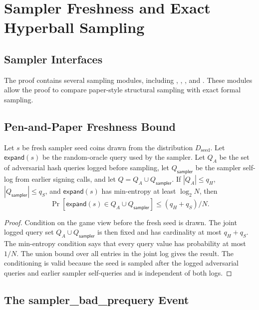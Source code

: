 \chapter{Sampler Freshness and Exact Hyperball Sampling}
\label{ch:sampler}

\section{Sampler Interfaces}

The proof contains several sampling modules, including
, ,
, and .
These modules allow the proof to compare paper-style structural sampling with
exact formal sampling.

\section{Pen-and-Paper Freshness Bound}

\begin{lemma}
Let \(s\) be fresh sampler seed coins drawn from the distribution
\(D_{\mathrm{seed}}\).  Let \(\mathsf{expand}(s)\) be the random-oracle query
used by the sampler.  Let \(Q_A\) be the set of adversarial hash queries logged
before sampling, let \(Q_{\mathsf{sampler}}\) be the sampler self-log from
earlier signing calls, and let
\(Q=Q_A\cup Q_{\mathsf{sampler}}\).  If \(|Q_A|\le q_H\),
\(|Q_{\mathsf{sampler}}|\le q_S\), and \(\mathsf{expand}(s)\) has min-entropy at
least \(\log_2 N\), then
\[
\Pr[\mathsf{expand}(s)\in Q_A\cup Q_{\mathsf{sampler}}]
\le (q_H+q_S)/N.
\]
\end{lemma}

\begin{proof}
Condition on the game view before the fresh seed is drawn.  The joint logged
query set \(Q_A\cup Q_{\mathsf{sampler}}\) is then fixed and has cardinality at
most \(q_H+q_S\).  The min-entropy condition says that every query value has
probability at most \(1/N\).  The union bound over all entries in the joint log
gives the result.  The conditioning is valid because the seed is sampled after
the logged adversarial queries and earlier sampler self-queries and is
independent of both logs.
\end{proof}

\section{The sampler\_bad\_prequery Event}

